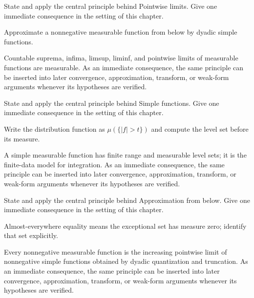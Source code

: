 \begin{exercise}\label{exr:iii02-04}
State and apply the central principle behind Pointwise limits. Give one immediate consequence in the setting of this chapter.
\end{exercise}
\begin{hint}
Approximate a nonnegative measurable function from below by dyadic simple functions.
\end{hint}
\begin{solution}
Countable suprema, infima, limsup, liminf, and pointwise limits of measurable functions are measurable. As an immediate consequence, the same principle can be inserted into later convergence, approximation, transform, or weak-form arguments whenever its hypotheses are verified.
\end{solution}

\begin{exercise}\label{exr:iii02-05}
State and apply the central principle behind Simple functions. Give one immediate consequence in the setting of this chapter.
\end{exercise}
\begin{hint}
Write the distribution function as \(\mu(\{|f|>t\})\) and compute the level set before its measure.
\end{hint}
\begin{solution}
A simple measurable function has finite range and measurable level sets; it is the finite-data model for integration. As an immediate consequence, the same principle can be inserted into later convergence, approximation, transform, or weak-form arguments whenever its hypotheses are verified.
\end{solution}

\begin{exercise}\label{exr:iii02-06}
State and apply the central principle behind Approximation from below. Give one immediate consequence in the setting of this chapter.
\end{exercise}
\begin{hint}
Almost-everywhere equality means the exceptional set has measure zero; identify that set explicitly.
\end{hint}
\begin{solution}
Every nonnegative measurable function is the increasing pointwise limit of nonnegative simple functions obtained by dyadic quantization and truncation. As an immediate consequence, the same principle can be inserted into later convergence, approximation, transform, or weak-form arguments whenever its hypotheses are verified.
\end{solution}

